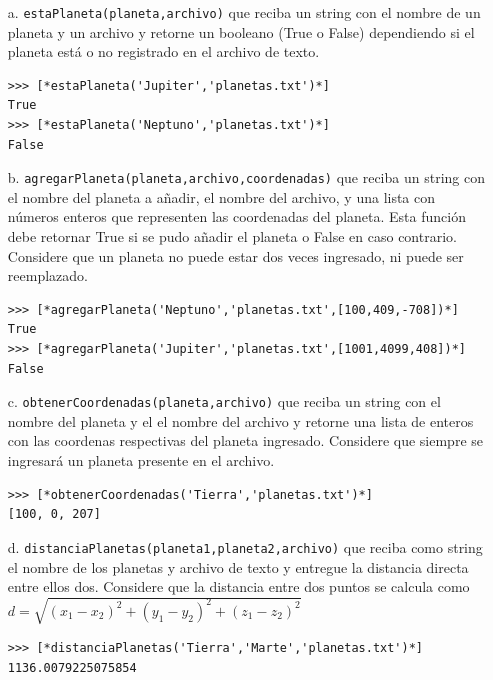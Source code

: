 \begin{itemize}
    \item[a.] \texttt{estaPlaneta(planeta,archivo)} que reciba un string con el nombre de un planeta y un archivo y retorne un booleano (True o False) dependiendo si el planeta está o no registrado en el archivo de texto.
    
    \begin{lstlisting}[style=consola]
>>> [*estaPlaneta('Jupiter','planetas.txt')*]
True
>>> [*estaPlaneta('Neptuno','planetas.txt')*]
False
    \end{lstlisting}
    
    \item[b.] \texttt{agregarPlaneta(planeta,archivo,coordenadas)} que reciba un string con el nombre del planeta a añadir, el nombre del archivo, y una lista con números enteros que representen las coordenadas del planeta. Esta función debe retornar True si se pudo añadir el planeta o False en caso contrario. Considere que un planeta no puede estar dos veces ingresado, ni puede ser reemplazado.
    
    \begin{lstlisting}[style=consola]
>>> [*agregarPlaneta('Neptuno','planetas.txt',[100,409,-708])*]
True
>>> [*agregarPlaneta('Jupiter','planetas.txt',[1001,4099,408])*]
False
    \end{lstlisting}
    
    \item[c.] \texttt{obtenerCoordenadas(planeta,archivo)} que reciba un string con el nombre del planeta y el el nombre del archivo y retorne una lista de enteros con las coordenas respectivas del planeta ingresado. Considere que siempre se ingresará un planeta presente en el archivo.
    
    \begin{lstlisting}[style=consola]
>>> [*obtenerCoordenadas('Tierra','planetas.txt')*]
[100, 0, 207]
    \end{lstlisting}
    
    \item[d.] \texttt{distanciaPlanetas(planeta1,planeta2,archivo)} que reciba como string el nombre de los planetas y archivo de texto y entregue la distancia directa entre ellos dos. Considere que la distancia entre dos puntos se calcula como $d=\sqrt{(x_1 - x_2)^2 + (y_1 - y_2)^2 + (z_1 - z_2)^2}$
    
    \begin{lstlisting}[style=consola]
>>> [*distanciaPlanetas('Tierra','Marte','planetas.txt')*]
1136.0079225075854
    \end{lstlisting}
    
\end{itemize}